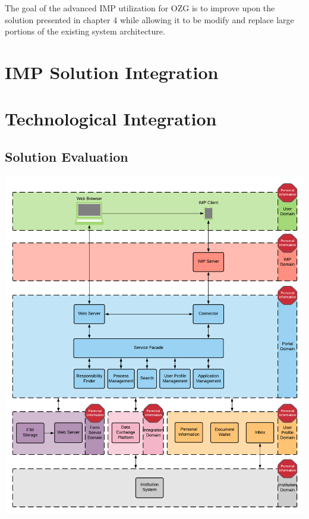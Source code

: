 
The goal of the advanced IMP utilization for OZG is to improve upon the solution presented in chapter 4 while allowing it to be modify and replace large portions of the existing system architecture. 

\section{IMP Solution Integration}



\section{Technological Integration}



\subsection{Solution Evaluation}

\begin{center}
    \includegraphics[scale=0.6]{Diagrams/Integration Architecture 2/Personal Information Existing Architecture.pdf}
\end{center}

